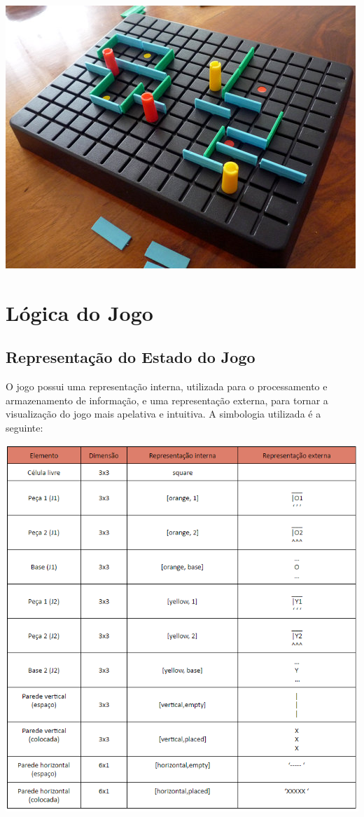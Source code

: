 \documentclass[a4paper]{article}
\begin{document}
\begin{center}
\includegraphics[scale = 0.4]{fig2.jpg}
\end{center}

\section{Lógica do Jogo}


\subsection{Representação do Estado do Jogo} 

O jogo possui uma representação interna, utilizada para o processamento e armazenamento de informação, e uma representação externa, para tornar a visualização do jogo mais apelativa e intuitiva. A simbologia utilizada é a seguinte: 


\begin{center}
\includegraphics[scale = 0.7]{fig3.png}
\end{center}
\end{document}
